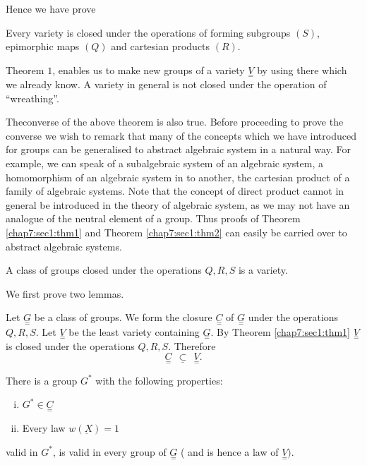 Hence we have prove 
\setcounter{theorem}{0}
\begin{theorem}\label{chap7:sec1:thm1} %
  Every variety is closed under the operations of forming  subgroups
  $(S)$, epimorphic maps $(Q)$ and cartesian products  $(R)$.  
\end{theorem}

Theorem $1$, enables us to make new groups of a variety $
\underset{=}{V} $ by using there which we already know. A variety in
general is not closed under the operation of  ``wreathing''. 

The\pageoriginale converse of the above theorem is also true. Before proceeding to
prove the converse we wish to remark that many of the concepts which
we have introduced for groups can be generalised to abstract algebraic
system in a natural way. For example, we can speak of a subalgebraic
system of an algebraic system, a homomorphism of an algebraic system
in to another, the cartesian product of a family of algebraic
systems. Note that the concept of direct product cannot in general be
introduced in the theory of algebraic system, as we may not have an
analogue of the neutral element of a group. Thus proofs of
Theorem \ref{chap7:sec1:thm1} and Theorem \ref{chap7:sec1:thm2}
can easily be  carried over to abstract algebraic systems. 

\begin{theorem}\label{chap7:sec1:thm2} %
  A class of groups  closed under the operations $ Q,R,S $ is a variety.
\end{theorem}

We first prove two lemmas.

Let $ \underset{=}{G} $ be a class of groups. We form the closure $
\underset{=}{C} $ of  $ \underset{=}{G} $ under the operations $
Q,R,S $. Let $ \underset{=}{V} $ be the least variety containing $
\underset{=}{G} $. By Theorem \ref{chap7:sec1:thm1} $ \underset{=}{V}
$ is closed under the operations $ Q,R,S $. Therefore 
$$
\underset{=}{C} ~~\underline{\subset} ~~\underset{=}{V}.
$$
\setcounter{Lemma}{0}
\begin{Lemma}\label{chap7:sec1:lem1}%
  There is a group  $G^*$ with the following properties:
  \begin{enumerate}[(i)]
  \item  $G^* \in \underset{=}{C}$
  \item Every law $w (\underbar{X}) = 1$
  \end{enumerate}
  valid in $G^*$, is valid in every group of $\underset{=}{G}$ ( and
  is hence a law of $\underset{=}{V} )$.  
\end{Lemma}

